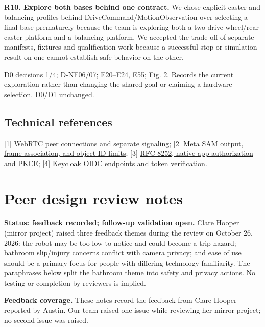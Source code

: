 \documentclass[12pt,letterpaper]{article}
\begin{document}
\begin{minipage}{\linewidth}
\textbf{R10. Explore both bases behind one contract.} We chose explicit caster and balancing profiles behind DriveCommand/MotionObservation over selecting a final base prematurely because the team is exploring both a two-drive-wheel/rear-caster platform and a balancing platform. We accepted the trade-off of separate manifests, fixtures and qualification work because a successful stop or simulation result on one cannot establish safe behavior on the other.

{\small D0 decisions 1/4; D-NF06/07; E20--E24, E55; Fig. 2. Records the current exploration rather than changing the shared goal or claiming a hardware selection. D0/D1 unchanged.\par}
\end{minipage}\par\medskip

\subsection*{Technical references}
\footnotesize
[1] \href{https://webrtc.org/getting-started/peer-connections}{WebRTC peer connections and separate signaling};
[2] \href{https://dev.meta.ai/docs/sam/reading-segmentation}{Meta SAM output, frame association, and object-ID limits};
[3] \href{https://www.rfc-editor.org/rfc/rfc8252}{RFC 8252, native-app authorization and PKCE};
[4] \href{https://www.keycloak.org/securing-apps/oidc-layers}{Keycloak OIDC endpoints and token verification}.
\normalsize

\clearpage
\section{Peer design review notes}
\textbf{Status: feedback recorded; follow-up validation open.} Clare Hooper (mirror project) raised three feedback themes during the review on October 26, 2026: the robot may be too low to notice and could become a trip hazard; bathroom slip/injury concerns conflict with camera privacy; and ease of use should be a primary focus for people with differing technology familiarity. The paraphrases below split the bathroom theme into safety and privacy actions. No testing or completion by reviewers is implied.

\textbf{Feedback coverage.} These notes record the feedback from Clare Hooper reported by Austin. Our team raised one issue while reviewing her mirror project; no second issue was raised.
\end{document}
